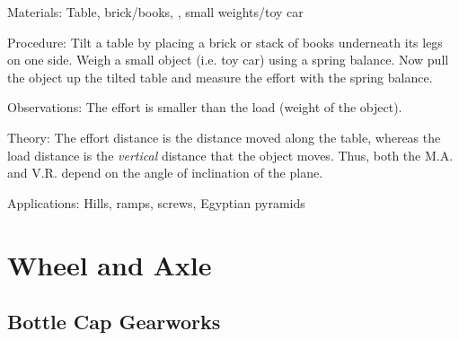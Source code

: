 \begin{multicols}{2}
\begin{description*}
\item[Materials:]{Table, brick/books, , small weights/toy car}
\item[Procedure:]{Tilt a table by placing a brick or stack of books underneath its legs on one side. Weigh a small object (i.e. toy car) using a spring balance. Now pull the object up the tilted table and measure the effort with the spring balance.}
\item[Observations:]{The effort is smaller than the load (weight of the object).}
\item[Theory:]{The effort distance is the distance moved along the table, whereas the load distance is the \emph{vertical} distance that the object moves. Thus, both the M.A. and V.R. depend on the angle of inclination of the plane.}
\item[Applications:]{Hills, ramps, screws, Egyptian pyramids}
\end{description*}


\section*{Wheel and Axle}


\subsection{Bottle Cap Gearworks}



\end{multicols}
